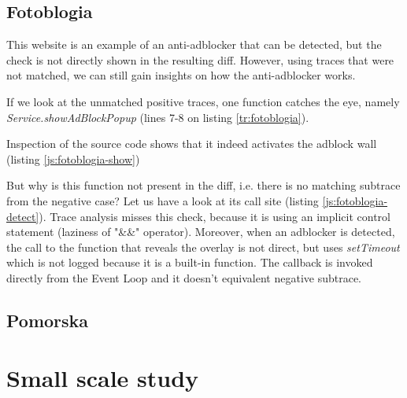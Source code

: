 

\subsection{Fotoblogia}


This website is an example of an anti-adblocker that can be detected, but the check is not directly
shown in the resulting diff. However, using traces that were not matched, we can still
gain insights on how the anti-adblocker works.

If we look at the unmatched positive traces, one function catches the eye, namely \emph{Service.showAdBlockPopup}
(lines 7-8 on listing \ref{tr:fotoblogia}).


                       
Inspection of the source code shows that it indeed activates the adblock wall (listing \ref{js:fotoblogia-show})


                       
But why is this function not present in the diff, i.e. there is no matching subtrace from the negative case?
Let us have a look at its call site (listing \ref{js:fotoblogia-detect}).
Trace analysis misses this check, because it is using an implicit control statement (laziness of "\&\&" operator).
Moreover, when an adblocker is detected, the call to the function that reveals the overlay is not direct, but
uses \emph{setTimeout} which is not logged because it is a built-in function.
The callback is invoked directly from the Event Loop and it doesn't equivalent negative subtrace.


                       

\subsection{Pomorska}


\section{Small scale study}

